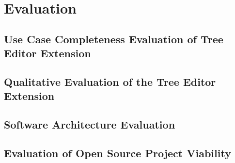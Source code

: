 \chapter{Evaluation}\label{chap:evaluation}

\section{Use Case Completeness Evaluation of Tree Editor Extension}




\section{Qualitative Evaluation of the Tree Editor Extension}




\section{Software Architecture Evaluation}

\section{Evaluation of Open Source Project Viability}


